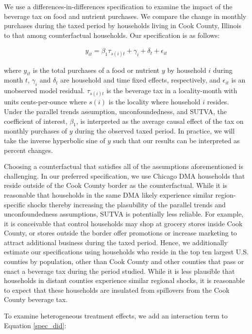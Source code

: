 \documentclass[12pt]{article}
\begin{document}
We use a differences-in-differences specification to examine the impact of the beverage tax on food and nutrient purchases. We compare the change in monthly purchases during the taxed period by households living in Cook County, Illinois to that among counterfactual households. Our specification is as follows:

\begin{align}
	y_{it} = \beta_1 \tau_{s(i)t} + \gamma_i + \delta_t + \epsilon_{it} \label{spec_did}
\end{align}

where $y_{it}$ is the total purchases of a food or nutrient $y$ by household $i$ during month $t$, $\gamma_i$ and $\delta_t$ are household and time fixed effects, respectively, and $\epsilon_{it}$ is an unobserved model residual. $\tau_{s(i)t}$ is the beverage tax in a locality-month with units cents-per-ounce where $s(i)$ is the locality where household $i$ resides. Under the parallel trends assumption, unconfoundedness, and SUTVA, the coefficient of interest, $\beta_1$, is interpreted as the average causal effect of the tax on monthly purchases of $y$ during the observed taxed period. In practice, we will take the inverse hyperbolic sine of $y$ such that our results can be interpreted as percent changes.

Choosing a counterfactual that satisfies all of the assumptions aforementioned is challenging. In our preferred specification, we use Chicago DMA households that reside outside of the Cook County border as the counterfactual. While it is reasonable that households in the same DMA likely experience similar region-specific shocks thereby increasing the plasubility of the parallel trends and unconfoundedness assumptions, SUTVA is potentially less reliable. For example, it is conceivable that control households may shop at grocery stores inside Cook County, or stores outside the border offer promotions or increase marketing to attract additional business during the taxed period. Hence, we additionally estimate our specifications using households who reside in the top ten largest U.S. counties by population, other than Cook County and other counties that pass or enact a beverage tax during the period studied. While it is less plausible that households in distant counties experience similar regional shocks, it is reasonable to expect that these households are insulated from spillovers from the Cook County beverage tax.

To examine heterogeneous treatment effects, we add an interaction term to Equation \ref{spec_did}:
\end{document}
